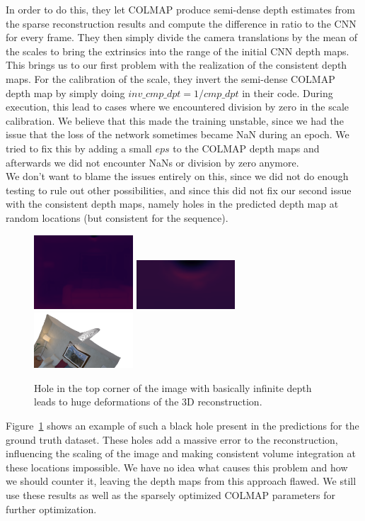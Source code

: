         In order to do this, they let COLMAP produce semi-dense depth estimates from the sparse reconstruction results and compute the difference in ratio to the CNN for every frame.
        They then simply divide the camera translations by the mean of the scales to bring the extrinsics into the range of the initial CNN depth maps.\\
        This brings us to our first problem with the realization of the consistent depth maps.
        For the calibration of the scale, they invert the semi-dense COLMAP depth map by simply doing $inv\_cmp\_dpt = 1 / cmp\_dpt$ in their code.
        During execution, this lead to cases where we encountered division by zero in the scale calibration.
        We believe that this made the training unstable, since we had the issue that the loss of the network sometimes became NaN during an epoch.
        We tried to fix this by adding a small $eps$ to the COLMAP depth maps and afterwards we did not encounter NaNs or division by zero anymore.\\
        We don't want to blame the issues entirely on this, since we did not do enough testing to rule out other possibilities, and since this did not fix our second issue with the consistent depth maps, namely holes in the predicted depth map at random locations (but consistent for the sequence).
        \begin{figure}
            \centering
            \includegraphics[width=0.33\textwidth]{images/hole.png}
            \includegraphics[width=0.33\textwidth]{images/hole_zoom.png}
            \includegraphics[width=0.33\textwidth]{images/hole_recon.png}
            \caption{Hole in the top corner of the image with basically infinite depth leads to huge deformations of the 3D reconstruction.}
            \label{holes}
        \end{figure}
        Figure~\ref{holes} shows an example of such a black hole present in the predictions for the ground truth dataset.
        These holes add a massive error to the reconstruction, influencing the scaling of the image and making consistent volume integration at these locations impossible.
        We have no idea what causes this problem and how we should counter it, leaving the depth maps from this approach flawed.
        We still use these results as well as the sparsely optimized COLMAP parameters for further optimization.
    

